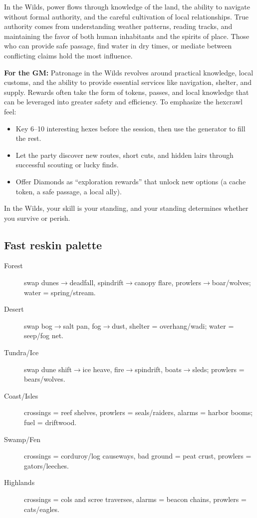 \begin{tcolorbox}[colback=black!3,colframe=black!40!white,title={Patronage \& Power},breakable]
In the Wilds, power flows through knowledge of the land, the ability to navigate without formal authority, and the careful cultivation of local relationships. True authority comes from understanding weather patterns, reading tracks, and maintaining the favor of both human inhabitants and the spirits of place. Those who can provide safe passage, find water in dry times, or mediate between conflicting claims hold the most influence.

\textbf{For the GM:}  
Patronage in the Wilds revolves around practical knowledge, local customs, and the ability to provide essential services like navigation, shelter, and supply. Rewards often take the form of tokens, passes, and local knowledge that can be leveraged into greater safety and efficiency. To emphasize the hexcrawl feel:
\begin{itemize}
\item Key 6--10 interesting hexes before the session, then use the generator to fill the rest.
\item Let the party discover new routes, short cuts, and hidden lairs through successful scouting or lucky finds.
\item Offer Diamonds as ``exploration rewards'' that unlock new options (a cache token, a safe passage, a local ally).
\end{itemize}
In the Wilds, your skill is your standing, and your standing determines whether you survive or perish.
\end{tcolorbox}

\subsection*{Fast reskin palette}
\label{sec:wilderness-reskin-palette}
\begin{description}
\item[Forest] swap dunes$\rightarrow$deadfall, spindrift$\rightarrow$canopy flare, prowlers$\rightarrow$boar/wolves; water = spring/stream.
\item[Desert] swap bog$\rightarrow$salt pan, fog$\rightarrow$dust, shelter = overhang/wadi; water = seep/fog net.
\item[Tundra/Ice] swap dune shift$\rightarrow$ice heave, fire$\rightarrow$spindrift, boats$\rightarrow$sleds; prowlers = bears/wolves.
\item[Coast/Isles] crossings = reef shelves, prowlers = seals/raiders, alarms = harbor booms; fuel = driftwood.
\item[Swamp/Fen] crossings = corduroy/log causeways, bad ground = peat crust, prowlers = gators/leeches.
\item[Highlands] crossings = cols and scree traverses, alarms = beacon chains, prowlers = cats/eagles.
\end{description}


